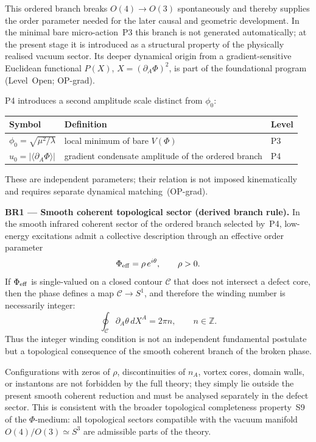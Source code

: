 \documentclass[11pt,a4paper]{article}
\numberwithin{equation}{section}
\begin{document}
This ordered branch breaks $O(4)\to O(3)$ spontaneously and thereby
supplies the order parameter needed for the later causal and geometric
development. In the minimal bare micro-action~P3 this branch is not
generated automatically; at the present stage it is introduced as a
structural property of the physically realised vacuum sector. Its
deeper dynamical origin from a gradient-sensitive Euclidean functional
$P(X)$, $X=(\partial_A\Phi)^2$, is part of the foundational program
(Level~Open; OP-grad).

P4 introduces a second amplitude scale distinct from $\phi_0$:
\begin{center}
\renewcommand{\arraystretch}{1.3}
\begin{tabular}{lll}
\hline
Symbol & Definition & Level \\
\hline
$\phi_0 = \sqrt{\mu^2/\lambda}$ & local minimum of bare $V(\Phi)$ & P3 \\
$u_0 = |\langle\partial_A\Phi\rangle|$ & gradient condensate amplitude of the ordered branch & P4 \\
\hline
\end{tabular}
\end{center}
These are independent parameters; their relation is not imposed
kinematically and requires separate dynamical matching~(OP-grad).

\medskip
\noindent\textbf{BR1 --- Smooth coherent topological sector (derived branch rule).}
\label{sec:BR1_coherent_sector}
In the smooth infrared coherent sector of the ordered branch selected
by~P4, low-energy excitations admit a collective description through
an effective order parameter
\[
\Phi_{\rm eff}=\rho\,e^{i\theta},
\qquad \rho>0.
\]
If $\Phi_{\rm eff}$ is single-valued on a closed contour
$\mathcal{C}$ that does not intersect a defect core, then the phase
defines a map $\mathcal{C}\to S^1$, and therefore the winding number
is necessarily integer:
\begin{equation}
  \label{eq:winding_condition}
  \oint_{\mathcal{C}}\partial_A\theta\,dX^A = 2\pi n,
  \qquad n\in\mathbb{Z}.
\end{equation}
Thus the integer winding condition is not an independent fundamental
postulate but a topological consequence of the smooth coherent branch
of the broken phase.

Configurations with zeros of $\rho$, discontinuities of $n_A$,
vortex cores, domain walls, or instantons are not forbidden by the
full theory; they simply lie outside the present smooth coherent
reduction and must be analysed separately in the defect sector.
This is consistent with the broader topological completeness property~S9
of the $\Phi$-medium: all topological sectors compatible with the vacuum
manifold $O(4)/O(3)\simeq S^3$ are admissible parts of the theory.
\end{document}
